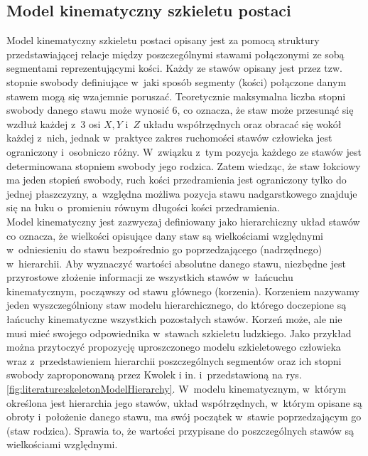 \subsection{Model kinematyczny szkieletu postaci}
Model kinematyczny szkieletu postaci opisany jest za pomocą struktury przedstawiającej relacje między poszczególnymi stawami połączonymi ze sobą segmentami reprezentującymi kości. Każdy ze stawów opisany jest przez tzw. stopnie swobody definiujące w~jaki sposób segmenty (kości) połączone danym stawem mogą się wzajemnie poruszać. Teoretycznie maksymalna liczba stopni swobody danego stawu może wynosić 6, co oznacza, że staw może przesunąć się wzdłuż każdej z~3 osi $X, Y$ i~$Z$ układu współrzędnych oraz obracać się wokół każdej z~nich, jednak w~praktyce zakres ruchomości stawów człowieka jest ograniczony i~osobniczo różny. W~związku z~tym pozycja każdego ze stawów jest determinowana stopniem swobody jego rodzica. Zatem wiedząc, że staw łokciowy ma jeden stopień swobody, ruch kości przedramienia jest ograniczony tylko do jednej płaszczyzny, a~względna możliwa pozycja stawu nadgarstkowego znajduje się na łuku o~promieniu równym długości kości przedramienia.\\
Model kinematyczny jest zazwyczaj definiowany jako hierarchiczny układ stawów co oznacza, że wielkości opisujące dany staw są wielkościami względnymi w~odniesieniu do stawu bezpośrednio go poprzedzającego (nadrzędnego) w~hierarchii. Aby wyznaczyć wartości absolutne danego stawu, niezbędne jest przyrostowe złożenie informacji ze wszystkich stawów w~łańcuchu kinematycznym, począwszy od stawu głównego (korzenia). Korzeniem nazywamy jeden wyszczególniony staw modelu hierarchicznego, do którego doczepione są łańcuchy kinematyczne wszystkich pozostałych stawów. Korzeń może, ale nie musi mieć swojego odpowiednika w~stawach szkieletu ludzkiego. Jako przykład można przytoczyć propozycję uproszczonego modelu szkieletowego człowieka wraz z~przedstawieniem hierarchii poszczególnych segmentów oraz ich stopni swobody zaproponowaną przez Kwolek i in.\cite{Kwolek2014} i~przedstawioną na rys. \ref{fig:literature:skeletonModelHierarchy}. W~modelu kinematycznym, w~którym określona jest hierarchia jego stawów, układ współrzędnych, w~którym opisane są obroty i~położenie danego stawu, ma swój początek w~stawie poprzedzającym go (staw rodzica). Sprawia to, że wartości przypisane do poszczególnych stawów są wielkościami względnymi.
											
